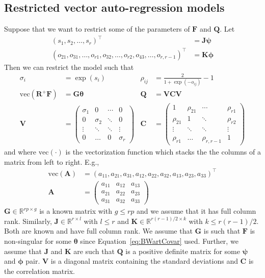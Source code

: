 \documentclass[notitlepage]{article}
\renewcommand{\vec}[1]{\bm{#1}}
\newcommand{\mat}[1]{\mathbf{#1}}
\newcommand{\Lparen}[1]{\left( #1\right)}
\newcommand{\optor}[2]{#1\Lparen{#2}}
\newcommand{\vecOP}[1]{\optor{\text{vec}}{#1}}
\newcommand{\dimState}{p}
\newcommand{\dimRng}{r}
\begin{document}
\subsection{Restricted vector auto-regression models}
Suppose that we want to restrict some of the parameters of $\mat{F}$ and $\mat{Q}$. Let%
%
\begin{align*}
  (s_1,s_2,\dots, s_\dimRng)^\top&=\mat{J}\vec\psi \\
  (o_{21},o_{31},\dots,o_{\dimRng1},o_{32},\dots,o_{r2},o_{43},\dots,o_{\dimRng,\dimRng-1})^\top&=\mat{K}\vec\phi  
\end{align*} %
%
Then we can restrict the model such that %
%
\begin{align*}
\sigma_i &= \exp(s_i) & 
  \rho_{ij}&= \frac{2}{1 + \exp(-o_{ij})} - 1 \\
\vecOP{\mat{R}^+\mat{F}} &= \mat{G}\vec{\theta} &  
  \mat{Q} &= \mat{V}\mat{C}\mat{V} \\
\mat{V} &= \begin{pmatrix} 
     \sigma_1 & 0 & \cdots & 0 \\
     0 & \sigma_2 & \ddots & 0 \\
     \vdots & \ddots & \ddots & \vdots \\
     0 & \dots & 0 & \sigma_\dimRng
   \end{pmatrix} &
  \mat{C} &= \begin{pmatrix} 
     1 & \rho_{21} & \cdots & \rho_{\dimRng1} \\
     \rho_{21} & 1 & \ddots & \rho_{\dimRng2} \\
     \vdots & \ddots & \ddots & \vdots \\
     \rho_{\dimRng1} & \dots & \rho_{\dimRng,\dimRng-1} & 1
   \end{pmatrix}
\end{align*}%
%
and where $\vecOP{\cdot}$ is the vectorization function which stacks the the columns of a matrix from left to right. E.g., %
%
\begin{align*}
\vecOP{\mat{A}} &= \Lparen{
	a_{11}, a_{21}, a_{31}, 
	a_{12}, a_{22}, a_{32},
	a_{13}, a_{23}, a_{33}}^\top \\
\mat{A} &= \begin{pmatrix}
	a_{11} & a_{12} & a_{13} \\
	a_{21} & a_{22} & a_{23} \\
	a_{31} & a_{32} & a_{33}
\end{pmatrix}
\end{align*}
%
$\mat{G}\in\mathbb{R}^{\dimRng\dimState \times g}$ is a known matrix with $g \leq \dimRng\dimState$ and we assume that it has full column rank. Similarly, $\mat{J}\in\mathbb{R}^{\dimRng \times l}$ with $l \leq \dimRng$ and $\mat{K}\in\mathbb{R}^{\dimRng(\dimRng - 1)/2 \times k}$ with $k\leq \dimRng(\dimRng - 1)/2$. Both are known and have full column rank. 
We assume that $\mat{G}$ is such that $\mat{F}$ is non-singular for some $\vec{\theta}$ since 
Equation~\eqref{eq:BWartCovar} used. Further, we assume that $\mat{J}$ and $\mat{K}$ are such that $\mat{Q}$ is a positive definite matrix for some $\vec{\psi}$ and $\vec{\phi}$ pair. $\mat{V}$ is a diagonal matrix containing the standard deviations and $\mat{C}$ is the correlation matrix.
\end{document}
